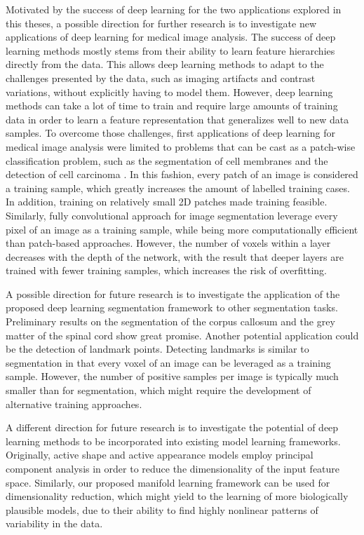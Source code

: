 Motivated by the success of deep learning for the two applications explored in
this theses, a possible direction for further research is to investigate new
applications of deep learning for medical image analysis. The success of deep
learning methods mostly stems from their ability to learn feature hierarchies
directly from the data. This allows deep learning methods to adapt to the
challenges presented by the data, such as imaging artifacts and contrast
variations, without explicitly having to model them. However, deep learning
methods can take a lot of time to train and require large amounts of training
data in order to learn a feature representation that generalizes well to new
data samples. To overcome those challenges, first applications of deep learning
for medical image analysis were limited to problems that can be cast as a
patch-wise classification problem, such as the segmentation of cell membranes
\citep{ciresan2012} and the detection of cell carcinoma \citep{cruz2013}. In
this fashion, every patch of an image is considered a training sample, which
greatly increases the amount of labelled training cases.
In addition, training on relatively small 2D patches made training feasible.
Similarly, fully convolutional approach for image segmentation leverage every
pixel of an image as a training sample, while being more computationally
efficient than patch-based approaches. However, the number of voxels within a
layer decreases with the depth of the network, with the result that deeper
layers are trained with fewer training samples, which increases the risk of
overfitting.

A possible direction for future research is to investigate the application of
the proposed deep learning segmentation framework to other segmentation tasks.
Preliminary results on the segmentation of the corpus callosum and the grey
matter of the spinal cord show great promise. Another potential application
could be the detection of landmark points. Detecting landmarks is similar to
segmentation in that every voxel of an image can be leveraged as a training
sample. However, the number of positive samples per image is typically much
smaller than for segmentation, which might require the development of
alternative training approaches.


A different direction for future research is to investigate the potential of
deep learning methods to be incorporated into existing model learning
frameworks. Originally, active shape \citep{cootes1995} and active appearance
\citep{cootes2001} models employ principal component analysis in order to reduce
the dimensionality of the input feature space. Similarly, our proposed manifold
learning framework can be used for dimensionality reduction, which might yield
to the learning of more biologically plausible models, due to their ability to
find highly nonlinear patterns of variability in the data.

